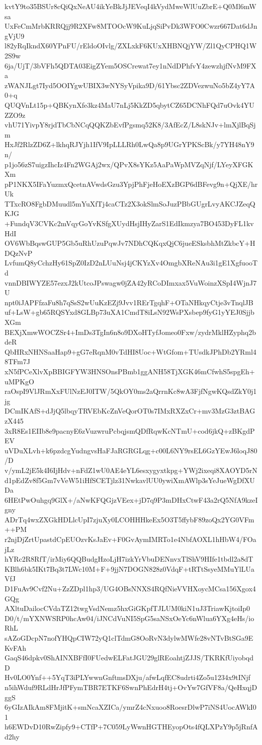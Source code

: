 kvtY9to35BSUr8cQiQxNeAU4ikYeBkJjJEVeqI4kVydMweWlUuZbrE+Q0Ml6mWsa
UxFeCmMrbKRRQjj9R2XFw8MTOOcW9KuLjqSiPvDk3WFO0Cwzr667Dat6dJngVjU9
l82yRqIkndX60YPnFU/rEldoOIvlg/ZXLxkF6KUxXHBNQjYW/Zl1QyCPHQ1W2S9w
6ja/UjT/3bVFh5QDTA03EigZYem5OSCrewat7ey1nNdDPhfvY4zewzhjfNvM9FXa
zWANJLgt7Iyd5OOIYgwUBIX3wNYSyVpika9D/61Ybsc2ZDVezwuNo5bZ4yY7A0+q
QUQVnLt15p+QBKynXfe3kz4MaU7nLj5KkZD5qbytCZ65DCNhFQd7uOvk4YUZZO9z
vhU71YivpY8rjdTbCbNCqQQKZbEvfPgsmq52K8/3AfEcZ/L8skNJv+lmXjlBqSjm
HxJf2RlzZD6Z+lkhqRJYjh1IfV9IpLLLRh0LwQa8p9UGrYPKScBk/y7YH48nY9n/
p1jo56zS7uigzIhcIz4Fn2WGAj2wx/QPvX8sYKz5AaPaWpMVZqNjf/LYeyXFGKXm
pP1NKX5IFaYuzmxQcetnAVwdsGzu3YpjPhFjeHoEXzBGP6dBFevg9n+QjXE/hrUk
TTxcRO8FgbDMuudl5mYuXfTj4caCTz2X3okSlmSoJuzPBbGUgrLvyAKCJZeqQKJG
+FundqV3CVKc2mVqyGoYvKSfgXUydHsjIHyZarS1EdIkmzya7BO453DyFL1kvHdI
OV6WbBqswGUP5Gb5uRhUzuPqwJv7NDhCQKqxQjC6jueESksbhMtZkbcY+HDQzNvP
LvfumQ8yCchzHy61SpZ0IzD2nLUuNsj4jCKYzXv4OmgbXReNAu3i1gE1XgfuooTd
vnnDBIWYZE57ezxJ2kUtcoJPswagw0jZA42yRCoDImxax5VuWoinzXSpI4WjnJ7U
npt0iJAPFfzaFu8h7qSsS2wUuKzEZj9Jvv1RErTgqhF+OTaNHkqyCtje3vTnqlJB
uf+LsW+gb65RQSYxd8GLBp73uXA1CmdT8iLsN92WsPXsbep9fyG1yYEJ0SjjbXGm
BEXjXmwWOCZSr4+ImDs3TgIn6n8o9DXoHTyfJomeo0Fxw/zydrMklHZyphq2bdeR
QbHRxNHNSaaHap9+gG7eRqnM0vTdHI8Uoc+WtGfom+TUsdkJPhDb2YRml48TFm7J
xN5fPCeXlvXpBBIGFYW3HNSOnsPBmb1ggANH58TjXGK46mCfwhS5spgEh+uMPKgO
raOspI9VlJRmXxFUlNzEJ0ITW/5QkOY0ms2aQrrnKc8wA3FjfNgwKQsdZkY0j1jg
DCmIKAfS+dJjQ5lbqyTRVEbKcZnVeQorOT0s7IMxRXZxCr+mv3MzG3ztBAGzX445
3xR8Es1EIIb8e9pacnyE6zVuzwruPcbqjsmQDfRqwKcNTmU+cod6jkQ+zBKgdPEV
uVDuXLvh+k6pzdcgYudngvsHaFJaRGRGLqg+c00L6NY9rsEL6GzYEwJ6loqJ80/D
v/ymL2jE5k4I6IjHdv+nFdZ1wU0AE4eYL6esxygyxtkpg+YWj2ixeqi8XAOYD5rN
d1pEdZv8f5Gm7vVeW51iHfSCETjlz31NwkavlUU0ywiXmAWlp3sYeJueWgDfXUDa
6HEtPwOuhgq9GlX+/aNwKFQGjzVEex+jD7q9P3mDHxCtwF43a2rQ5NfA9kzeIgny
ADrTq4wxZXGkHDLlcUpI7zjuXy0LCOHHHkeEx5O3T5ffybF89zoQx2YG0VFm++PM
r2njDjZrtUpastdCpEUOzvKsJaEv+F0GvAymIMRTo1e4NbfAOXL1hHbW4/FOajLz
hYRc2R8RfT/irMiy6QQBudgHzoLjH7izkYrVbuDENnvxTlShV9HIfe1tbdl2a8dT
KBlh6bk5IKt7Bq3t7LWc10M+F+9jjN7DOGN828z0VdqF+tRTtSsyeMMuYlLUaVfJ
D1FuAv9Cvf2Nu+ZzZDpl1hp3/UG4OBsNNXS4RQfNieVVHXoycMCsa156Xgox4GQg
AXltuDailocCVdaTZ12twgVsdNemz5hxGiGKpfTJLUM0kiN1uJ3TriawKjtoiIp0
D0/t/mYXNWSRP0hcAw04/iJNCdVuNI5SpG5saNSxOeYc6nWlua6YXg4eHs/ioRhL
sAZoGDcpN7nofYHQpCIW72yQ1clTdmG8OoRvN3dylwMWfe28vNTvBtSGa9EKvFAh
GaqS46dpkv0ShAINXBFfI0FUedwELFatJGU29glREoahtjZJJS/TKRKfUiyobqdD
Hv0LO0Ynf++5YqT3iPLYwwnGnftmsDXju/afwLqfEC8udrti4Zo5u1234x9tINjf
n5ihWduf9RLdHrJfPFymTBR7ETKF6SwnPhEdrH4tj+OvYw7GfVF8a/QeHxqjDggS
6yGIzAIkAm8FMjitK+smNcaXZICa/ymrZ4cNxuoo8RoesrDlwP7iNS4UocAWkI01
h6EWDvD10RwZipfy9+CTfP+7C059LyWwnHGTHEyopOts4fQLXPzY9p5jRnfAd2hy
